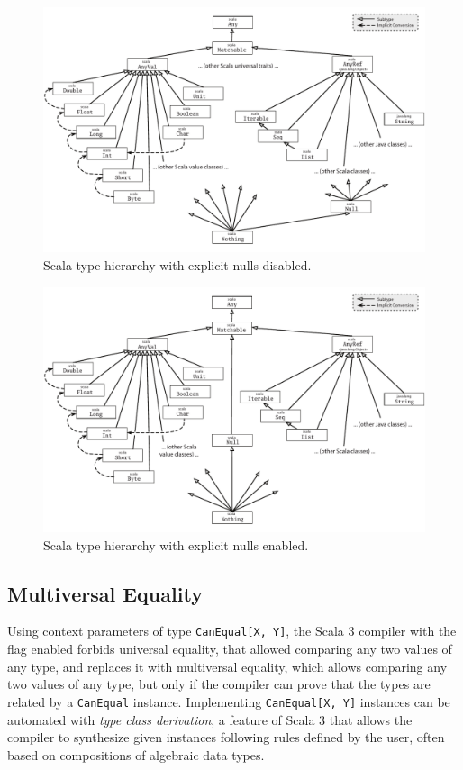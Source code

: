 \begin{figure}
    \centering
    \includegraphics[width=.8\linewidth]{figures/scalaHierarchyWithMatchable.png}
    \caption{Scala type hierarchy with explicit nulls disabled.}
    \label{fig:scala-hierarchy-with-explicit-nulls-disabled}
\end{figure}

\begin{figure}
    \centering
    \includegraphics[width=.8\linewidth]{figures/scalaHierarchyWithMatchableAndSafeNull.png}
    \caption{Scala type hierarchy with explicit nulls enabled.}
    \label{fig:scala-hierarchy-with-explicit-nulls-enabled}
\end{figure}


\subsection{Multiversal Equality} \label{chap:background->sec:scala3->subsec:multiversal-equality}

Using context parameters of type \texttt{CanEqual[X, Y]}, the Scala 3 compiler with the  flag enabled forbids universal equality, that allowed comparing any two values of any type, and replaces it with multiversal equality, which allows comparing any two values of any type, but only if the compiler can prove that the types are related by a \texttt{CanEqual} instance.
%
Implementing \texttt{CanEqual[X, Y]} instances can be automated with \textit{type class derivation}, a feature of Scala 3 that allows the compiler to synthesize given instances following rules defined by the user, often based on compositions of algebraic data types.
